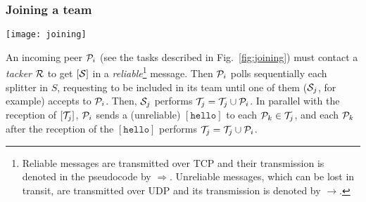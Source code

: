 \subsubsection{Joining a team}
\label{dbs:joining}
\begin{figure*}
  \texttt{[image: joining]}
  \caption{Peer joining.\label{fig:joining}}
\end{figure*}
An incoming peer ${\cal P}_i$ (see the tasks described in
Fig.~\ref{fig:joining}) must contact a \emph{tacker} ${\cal R}$ to get
$[{\cal S}]$ in a \emph{reliable}\footnote{Reliable messages are
  transmitted over TCP and their transmission is denoted in the
  pseudocode by $\Rightarrow$. Unreliable messages, which can be lost
  in transit, are transmitted over UDP and its transmission is denoted
  by $\rightarrow$.} message. Then ${\cal P}_i$ polls sequentially
each splitter in $S$, requesting to be included in its team until one
of them (${\cal S}_j$, for example) accepts to ${\cal P}_i$. Then,
${\cal S}_j$ performs ${\cal T}_j = {\cal T}_j \cup {\cal P}_i$. In
parallel with the reception of $[{\cal T}_j]$, ${\cal P}_i$ sends a
(unreliable) $[\mathtt{hello}]$ to each ${\cal P}_k\in {\cal T}_j$,
and each ${\cal P}_k$ after the reception of the $[\mathtt{hello}]$
performs ${\cal T}_j = {\cal T}_j \cup {\cal P}_i$.

